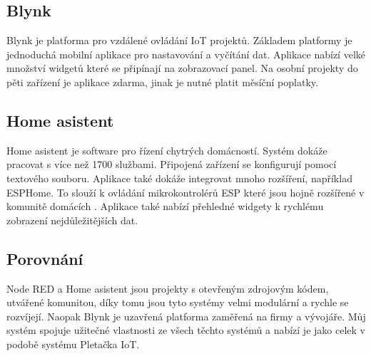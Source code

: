 \subsection{Blynk}
Blynk je platforma pro vzdálené ovládání IoT projektů.
Základem platformy je jednoduchá mobilní aplikace pro nastavování a vyčítání dat.
Aplikace nabízí velké množství widgetů které se připínají na zobrazovací panel.
Na osobní projekty do pěti zařízení je aplikace zdarma, jinak je nutné platit měsíční poplatky.


\subsection{Home asistent}
Home asistent je software pro řízení chytrých domácností. 
Systém dokáže pracovat s více než 1700 službami.
Připojená zařízení se konfigurují pomocí textového souboru.
Aplikace také dokáže integrovat mnoho rozšíření, například ESPHome.
To slouží k ovládání mikrokontrolérů ESP které jsou hojně rozšířené v komunitě domácích .
Aplikace také nabízí přehledné widgety k rychlému zobrazení nejdůležitějších dat. 


\subsection{Porovnání}
Node RED a Home asistent jsou projekty s otevřeným zdrojovým kódem, utvářené komunitou, díky tomu jsou tyto systémy velmi modulární a rychle se rozvíjejí. %
Naopak Blynk je uzavřená platforma zaměřená na firmy a vývojáře.
Můj systém spojuje užitečné vlastnosti ze všech těchto systémů a nabízí je jako celek v podobě systému Pletačka IoT.
